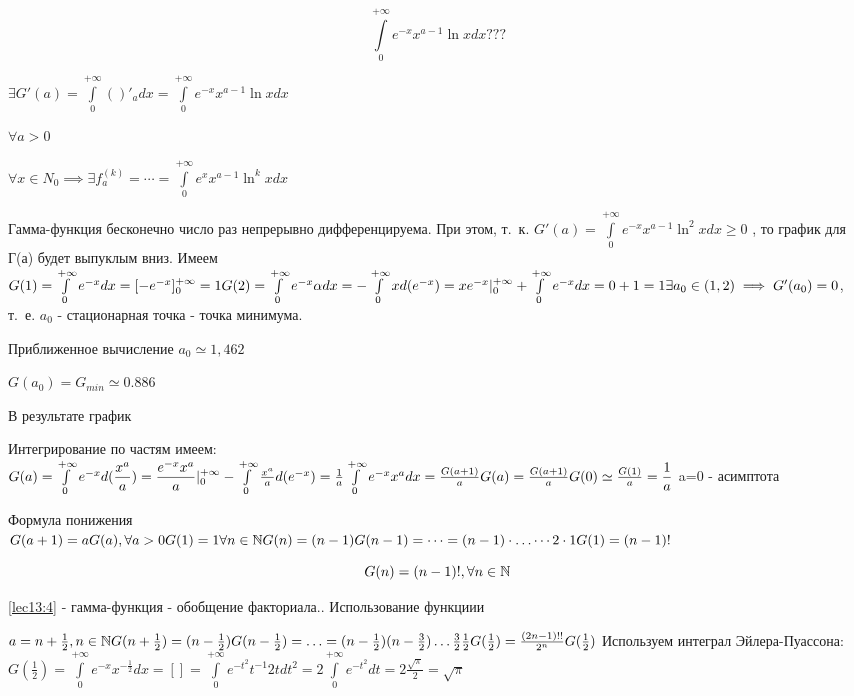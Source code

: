 \documentclass[../../main.tex]{subfiles}
\begin{document}
\[
\int\limits_0^{+\infty} e^{-x} x^{a-1} \ln x dx ???
\]

$
\exists G'(a) = \int\limits_0^{+\infty} ()'_a dx = \int\limits_0^{+\infty} e^{-x} x^{a-1} \ln x dx 
$

$\forall a > 0$

$
\forall x \in N_0 \implies \exists f^{(k)}_a = \cdots = \int\limits_0^{+\infty} e^x x^{a-1} \ln^k x dx 
$

Гамма-функция бесконечно число раз непрерывно дифференцируема.
При этом, т.~к. $G'(a) = \int\limits_0^{+\infty} e^{-x} x^{a-1} \ln^2 x dx \ge 0$ , то график для Г(а) будет выпуклым вниз. Имеем
$
G(1) = \int\limits_0^{+\infty} e^{-x} dx = [-e^{-x}]^{+\infty}_0 = 1
\\
G(2) = \int\limits_0^{+\infty} e^{-x} \alpha dx = - \int\limits_0^{+\infty} x d(e^{-x}) = xe^{-x}|^{+\infty}_0 + \int\limits_0^{+\infty} e^{-x} dx = 0 + 1 = 1
\\
\exists a_0 \in (1, 2) \implies G'(a_0) = 0$, т.~е. $a_0$ - стационарная точка - точка минимума.

Приближенное вычисление $a_0 \simeq 1,462$

$G(a_0) = G_{min} \simeq 0.886$

В результате график

Интегрирование по частям имеем:
$
G(a) = \int\limits_0^{+\infty} e^{-x} d(\dfrac{x^a}{a}) = \dfrac{e^{-x}x^a}{a} |^{+\infty}_0 - \int\limits_0^{+\infty} \frac{x^a}{a} d(e^{-x}) = \frac{1}{a} \int\limits_0^{+\infty} e^{-x} x^a dx = \frac{G(a+1)}{a}
\\
G(a) = \frac{G(a+1)}{a}
\\
G(0) \simeq \frac{G(1)}{a} = \dfrac{1}{a}
$
a=0 - асимптота

Формула понижения
\\
$
G(a+1) = aG(a), \forall a > 0
\\
G(1) = 1
\\
\forall n \in \mathbb{N}
\\
G(n) = (n-1)G(n-1) = \cdots = (n-1) \cdot \ldots \cdots 2 \cdot 1 G(1) = (n-1)!
$

\begin{equation}
\label{lec13:4}
G(n) = (n-1)!,  \forall n \in \mathbb{N}
\end{equation}

\eqref{lec13:4} - гамма-функция - обобщение факториала.. Использование функциии

$
a = n + \frac{1}{2}, n \in \mathbb{N}
\\
G(n + \frac{1}{2}) = (n - \frac{1}{2})G(n-\frac{1}{2})=\ldots=(n-\frac{1}{2})(n-\frac{3}{2})\ldots\frac{3}{2}\frac{1}{2}G(\frac{1}{2}) = \frac{(2n-1)!!}{2^n}G(\frac{1}{2})
$
Используем интеграл Эйлера-Пуассона:
\\
$
G(\frac{1}{2})= \int\limits_0^{+\infty} e^{-x} x^{-\frac{1}{2}} dx = [] = \int\limits_0^{+\infty} e^{-t^2} t^{-1} 2t dt^2 = 2 \int\limits_0^{+\infty} e^{-t^2} dt = 2 \frac{\sqrt{\pi}}{2} = \sqrt{\pi}
$
\end{document}
